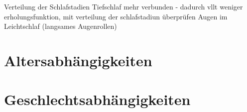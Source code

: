 Verteilung der Schlafstadien
Tiefschlaf mehr verbunden - dadurch vllt weniger erholungsfunktion, mit verteilung der schlafstadiun überprüfen
Augen im Leichtschlaf (langsames Augenrollen)

\section{Altersabhängigkeiten}

\section{Geschlechtsabhängigkeiten}